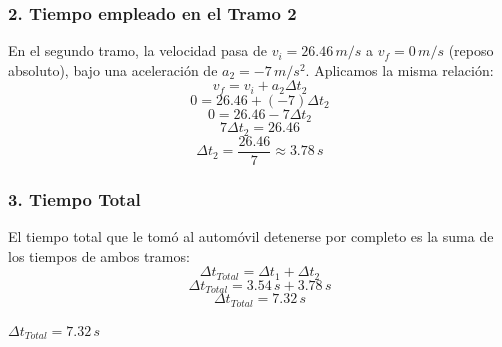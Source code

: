 \documentclass[12pt, a4paper]{article}
\begin{document}
\subsubsection*{2. Tiempo empleado en el Tramo 2}
En el segundo tramo, la velocidad pasa de $v_i = 26.46 \, \si{m/s}$ a $v_f = 0 \, \si{m/s}$ (reposo absoluto), bajo una aceleración de $a_2 = -7 \, \si{m/s^2}$.
Aplicamos la misma relación:
$$ v_f = v_i + a_2\Delta t_2 $$
$$ 0 = 26.46 + (-7)\Delta t_2 $$
$$ 0 = 26.46 - 7\Delta t_2 $$
$$ 7\Delta t_2 = 26.46 $$
$$ \Delta t_2 = \frac{26.46}{7} \approx 3.78 \, \si{s} $$

\subsubsection*{3. Tiempo Total}
El tiempo total que le tomó al automóvil detenerse por completo es la suma de los tiempos de ambos tramos:
$$ \Delta t_{Total} = \Delta t_1 + \Delta t_2 $$
$$ \Delta t_{Total} = 3.54 \, \si{s} + 3.78 \, \si{s} $$
$$ \Delta t_{Total} = 7.32 \, \si{s} $$

\begin{tcolorbox}[colback=green!5!white, colframe=green!50!black, title=Respuesta Final]
\centering \Large $\Delta t_{Total} = 7.32 \, \si{s}$
\end{tcolorbox}
\end{document}
